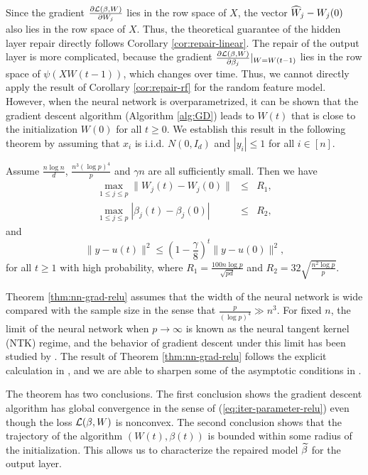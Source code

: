 Since the gradient $\frac{\partial {\mathcal L}(\beta,W)}{\partial W_j}$ lies in the row space of $X$, the vector $\widehat{W}_j-W_j(0)$ also lies in the row space of $X$. Thus, the theoretical guarantee of the hidden layer repair directly follows
Corollary \ref{cor:repair-linear}.
The repair of the output layer is more complicated, because the gradient $\frac{\partial {\mathcal L}(\beta,W)}{\partial \beta_j}|_{W=W(t-1)}$ lies in the row space of $\psi(XW(t-1))$, which changes over time. Thus, we cannot directly apply the result of Corollary \ref{cor:repair-rf} for the random feature model. However, when the neural network is overparametrized, it can be shown that the gradient descent algorithm (Algorithm \ref{alg:GD}) leads to $W(t)$ that is close to the initialization $W(0)$ for all $t\geq 0$. We establish this result in the following theorem by assuming that $x_i$ is i.i.d. $N(0,I_d)$ and $|y_i|\leq 1$ for all $i\in[n]$.
\vskip10pt

\begin{thm}\label{thm:nn-grad-relu}
Assume $\frac{n\log n}{d}$, $\frac{n^3(\log p)^4}{p}$ and $\gamma n$ are all sufficiently small. Then we have
\begin{eqnarray}
\label{eq:iter-parameter-relu} \max_{1\leq j\leq p}\|W_j(t)-W_j(0)\| &\leq& R_1, \\
\label{eq:iter-parameter-beta-relu} \max_{1\leq j\leq p}|\beta_j(t)-\beta_j(0)| &\leq& R_2,
\end{eqnarray}
and
\begin{equation}
\|y-u(t)\|^2 \leq \left(1-\frac{\gamma}{8}\right)^t\|y-u(0)\|^2, \label{eq:iter-function-relu}
\end{equation}
for all $t\geq 1$ with high probability, where $R_1=\frac{100n\log p}{\sqrt{pd}}$ and $R_2=32\sqrt{\frac{n^2\log p}{p}}$.
\end{thm}

Theorem \ref{thm:nn-grad-relu} assumes that the width of the neural network is wide compared with the sample size in the sense that $\frac{p}{(\log p)^4}\gg n^3$. For fixed $n$, the limit of the neural network when $p\rightarrow\infty$ is known as the neural tangent kernel (NTK) regime, and the behavior of gradient descent under this limit has been studied by \cite{jacot2018neural}. The result of Theorem \ref{thm:nn-grad-relu} follows the explicit calculation in \cite{du2018gradient}, and we are able to sharpen some of the asymptotic conditions in \cite{du2018gradient}.

The theorem has two conclusions. The first conclusion shows the gradient descent algorithm has global convergence in the sense of (\ref{eq:iter-parameter-relu}) even though the loss ${\mathcal L}(\beta,W)$ is nonconvex. The second conclusion shows that the trajectory of the algorithm $(W(t),\beta(t))$ is bounded within some radius of the initialization. This allows us to characterize the repaired model $\widetilde{\beta}$ for the output layer.

